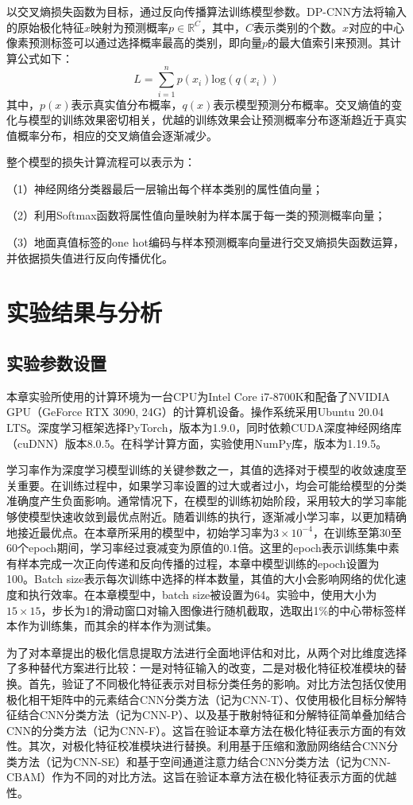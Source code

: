 以交叉熵损失函数为目标，通过反向传播算法训练模型参数。DP-CNN方法将输入的原始极化特征$x$映射为预测概率$p\in \mathbb{R}^{C}$，其中，$C$表示类别的个数。$x$对应的中心像素预测标签可以通过选择概率最高的类别，即向量$p$的最大值索引来预测。其计算公式如下：
\begin{equation}
    L=\sum_{i=1}^{n}p(x_i)\text{log}(q(x_i))
\end{equation}
其中，$p(x)$表示真实值分布概率，$q(x)$表示模型预测分布概率。交叉熵值的变化与模型的训练效果密切相关，优越的训练效果会让预测概率分布逐渐趋近于真实值概率分布，相应的交叉熵值会逐渐减少。

整个模型的损失计算流程可以表示为：

（1）神经网络分类器最后一层输出每个样本类别的属性值向量；

（2）利用Softmax函数将属性值向量映射为样本属于每一类的预测概率向量；

（3）地面真值标签的one hot编码与样本预测概率向量进行交叉熵损失函数运算，并依据损失值进行反向传播优化。


\section{实验结果与分析}
\subsection{实验参数设置}
本章实验所使用的计算环境为一台CPU为Intel Core i7-8700K和配备了NVIDIA GPU（GeForce RTX 3090, 24G）的计算机设备。操作系统采用Ubuntu 20.04 LTS。深度学习框架选择PyTorch，版本为1.9.0，同时依赖CUDA深度神经网络库（cuDNN）版本8.0.5。在科学计算方面，实验使用NumPy库，版本为1.19.5。

学习率作为深度学习模型训练的关键参数之一，其值的选择对于模型的收敛速度至关重要。在训练过程中，如果学习率设置的过大或者过小，均会可能给模型的分类准确度产生负面影响。通常情况下，在模型的训练初始阶段，采用较大的学习率能够使模型快速收敛到最优点附近。随着训练的执行，逐渐减小学习率，以更加精确地接近最优点。在本章所采用的模型中，初始学习率为$3\times 10^{-4}$，在训练至第30至60个epoch期间，学习率经过衰减变为原值的0.1倍。这里的epoch表示训练集中素有样本完成一次正向传递和反向传播的过程，本章中模型训练的epoch设置为100。Batch size表示每次训练中选择的样本数量，其值的大小会影响网络的优化速度和执行效率。在本章模型中，batch size被设置为64。实验中，使用大小为$15 \times 15$，步长为1的滑动窗口对输入图像进行随机截取，选取出1\%的中心带标签样本作为训练集，而其余的样本作为测试集。

为了对本章提出的极化信息提取方法进行全面地评估和对比，从两个对比维度选择了多种替代方案进行比较：一是对特征输入的改变，二是对极化特征校准模块的替换。首先，验证了不同极化特征表示对目标分类任务的影响。对比方法包括仅使用极化相干矩阵中的元素结合CNN分类方法（记为CNN-T）、仅使用极化目标分解特征结合CNN分类方法（记为CNN-P）、以及基于散射特征和分解特征简单叠加结合CNN的分类方法（记为CNN-F）。这旨在验证本章方法在极化特征表示方面的有效性。其次，对极化特征校准模块进行替换。利用基于压缩和激励网络结合CNN分类方法（记为CNN-SE）和基于空间通道注意力结合CNN分类方法（记为CNN-CBAM）作为不同的对比方法。这旨在验证本章方法在极化特征表示方面的优越性。

